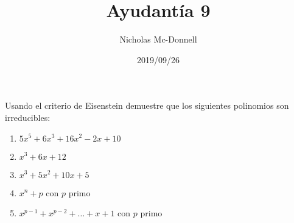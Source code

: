 \documentclass{ayudantia}
\title{Ayudantía 9}
\date{2019/09/26}
\author{Nicholas Mc-Donnell}
\begin{document}
\maketitle
Usando el criterio de Eisenstein demuestre que los siguientes polinomios son irreducibles:
\begin{enumerate}
    \item \(5x^5+6x^3+16x^2-2x+10\)
    \item \(x^3+6x+12\)
    \item \(x^3+5x^2+10x+5\)
    \item \(x^n+p\) con \(p\) primo
    \item \(x^{p-1}+x^{p-2}+\dots+x+1\) con \(p\) primo
\end{enumerate}
\end{document}
